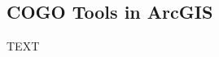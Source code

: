 \documentclass[class=book , crop=false]{standalone}
\title{}  %
\begin{document}


\subsection{COGO Tools in ArcGIS}
TEXT 
\end{document}
